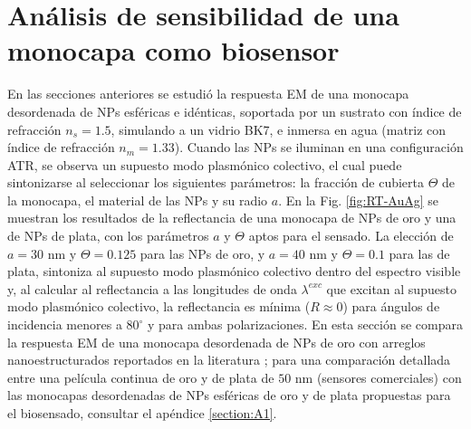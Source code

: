 
\section{Análisis de sensibilidad  de una monocapa como biosensor}
\label{section:sensLambda}

En las secciones anteriores se estudió la respuesta EM de una monocapa desordenada de NPs esféricas e idénticas, soportada por un sustrato con índice de refracción $n_s=1.5$, simulando a un vidrio BK7, e inmersa en agua (matriz con índice de refracción $n_m=1.33$). Cuando las NPs se iluminan en una configuración ATR, se observa un supuesto modo  plasmónico colectivo, el cual puede sintonizarse al seleccionar los siguientes parámetros: la fracción de cubierta $\Theta$ de la monocapa, el material de las NPs y su radio $a$. En la Fig. \ref{fig:RT-AuAg} se muestran los resultados de la reflectancia de una monocapa de NPs de oro y una de NPs de plata, con los parámetros $a$ y $\Theta$ aptos para el sensado. La elección de $a=30$ nm y $\Theta=0.125$ para las NPs de oro, y $a=40$ nm y $\Theta=0.1$ para las de plata, sintoniza al supuesto modo  plasmónico colectivo dentro del espectro visible y, al calcular al reflectancia a las longitudes de onda $\lambda^{exc}$ que excitan al supuesto modo  plasmónico colectivo, la reflectancia es mínima ($R\approx 0$) para ángulos de incidencia menores a $80^\circ$ y para ambas polarizaciones. En esta sección se compara la respuesta EM de una monocapa desordenada de NPs de oro con arreglos nanoestructurados reportados en la literatura \cite{danilov2018ultra,svedendahl2009refractometric}; para una comparación detallada entre una película continua de oro y de plata de $50$ nm (sensores comerciales) con las monocapas desordenadas de NPs esféricas de oro y de plata propuestas para el biosensado, consultar el apéndice \ref{section:A1}.

